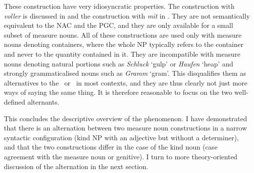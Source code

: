 \begin{exe}
  \ex\label{ex:alternatives}
  \begin{xlist}
  \end{xlist}
\end{exe}

These construction have very idiosyncratic properties.
The construction with \textit{voller} is discussed in \cite{Zeldes2018} and the construction with \textit{mit} in \cite{Bhatt1990}.
They are not semantically equivalent to the NAC and the PGC, and they are only available for a small subset of measure nouns.
All of these constructions are used only with measure nouns denoting containers, where the whole NP typically refers to the container and never to the quantity contained in it.
They are incompatible with measure nouns denoting natural portions such as \textit{Schluck} `gulp' or \textit{Haufen} `heap' and strongly grammaticalised nouns such as \textit{Gramm} `gram'.
This disqualifies them as alternatives to the \NACa\ or \PGCa\ in most contexts, and they are thus clearly not just more ways of saying the same thing. 
It is therefore reasonable to focus on the two well-defined alternants.

This concludes the descriptive overview of the phenomenon.
I have demonstrated that there is an alternation between two measure noun constructions in a narrow syntactic configuration (kind NP with an adjective but without a determiner), and that the two constructions differ in the case of the kind noun (case agreement with the measure noun or genitive).
I turn to more theory-oriented discussion of the alternation in the next section.



